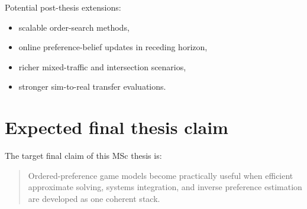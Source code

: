 Potential post-thesis extensions:

\begin{itemize}
    \item scalable order-search methods,
    \item online preference-belief updates in receding horizon,
    \item richer mixed-traffic and intersection scenarios,
    \item stronger sim-to-real transfer evaluations.
\end{itemize}

\section{Expected final thesis claim}

The target final claim of this MSc thesis is:

\begin{quote}
Ordered-preference game models become practically useful when efficient
approximate solving, systems integration, and inverse preference estimation are
developed as one coherent stack.
\end{quote}
